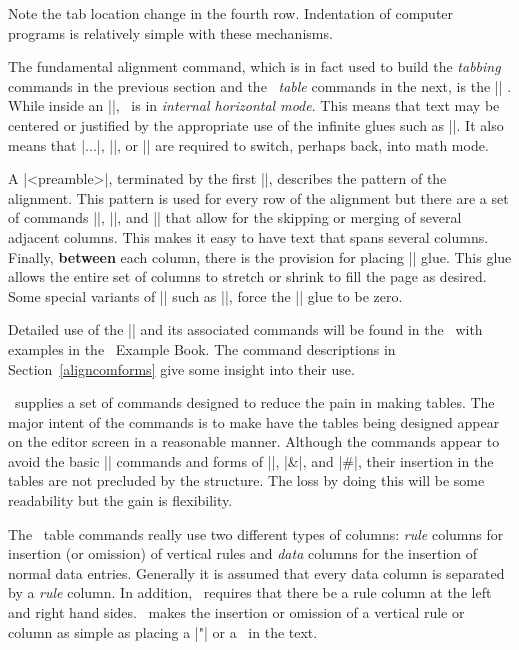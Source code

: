 Note the tab location change in the fourth row. Indentation of computer
programs is relatively simple with these mechanisms. 



The fundamental alignment command, which is in fact 
used to build the {\it tabbing} commands in the previous
section and the \intex\ {\it table} commands in the next,  
is the |\halign| .
While inside  an |\halign|, \tex\ is in {\it
internal horizontal mode}. This means that text may be centered or justified 
by the appropriate use of the infinite glues such as |\hss|. It also means
that |$...$|,  |\math|, or |\displaymath| are required 
to switch, perhaps back, into math mode. 

A |<preamble>\cr|,  terminated by the first |\cr|,  describes the pattern
of the alignment. This pattern is used for every row of the alignment but
there are a  set of commands |\span|, |\multispan|, and |\omit| that
allow for the skipping or merging of several adjacent columns. This makes it
easy to have text that spans several columns. Finally, {\bf between} 
each column,
there is the provision for placing |\tabskip| glue. This glue allows the
entire set of columns to stretch or shrink to fill the page as desired. Some
special variants of |\halign| such as |\ialign|, force the |\tabskip|
glue to be zero.

Detailed use of the |\halign| and its associated commands will be found in
the \texbook\ with examples in the \tex\ Example Book. The command
descriptions in Section~\ref{aligncomforms} give some insight into their use.

\intex\ supplies a set of commands designed to reduce the pain in making
tables. The major intent of the commands is to make have the tables being
designed appear on the editor screen in a reasonable manner. Although the
commands appear to avoid the basic |\halign| commands and forms of |\cr|,
|&|, and |#|, their insertion in the tables are not precluded by the
structure. The loss by doing this will be some readability but the gain is
flexibility.

The \intex\ table commands really use two different types of columns: {\it
rule} columns for insertion (or omission) of vertical rules and {\it data}
columns 
for the insertion of normal data entries. Generally it is assumed that every
data column is separated by a {\it rule} column. In addition, \intex\
requires that there be a rule column at the  left and right hand sides.
\intex\ makes the insertion or omission of a vertical rule or column as
simple as placing a |"| or a \vrt\ in the text. 


